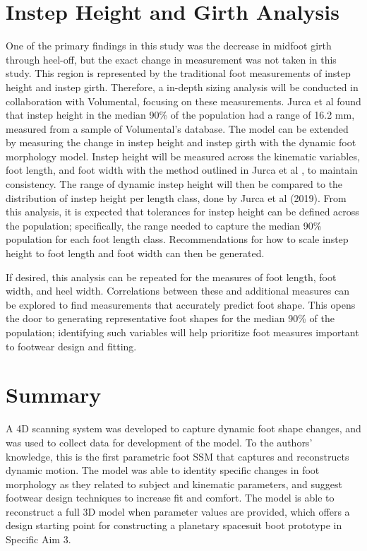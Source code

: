\documentclass[defaultstyle,11pt]{comps}
\begin{document}
\hypertarget{instep-height-and-girth-analysis}{%
\section{Instep Height and Girth Analysis}\label{instep-height-and-girth-analysis}}

One of the primary findings in this study was the decrease in midfoot girth through heel-off, but the exact change in measurement was not taken in this study.
This region is represented by the traditional foot measurements of instep height and instep girth.
Therefore, a in-depth sizing analysis will be conducted in collaboration with Volumental, focusing on these measurements.
Jurca et al \citep{Jurca2019} found that instep height in the median 90\% of the population had a range of 16.2 mm, measured from a sample of Volumental's database.
The model can be extended by measuring the change in instep height and instep girth with the dynamic foot morphology model.
Instep height will be measured across the kinematic variables, foot length, and foot width with the method outlined in Jurca et al \citep{Jurca2019}, to maintain consistency.
The range of dynamic instep height will then be compared to the distribution of instep height per length class, done by Jurca et al (2019).
From this analysis, it is expected that tolerances for instep height can be defined across the population; specifically, the range needed to capture the median 90\% population for each foot length class.
Recommendations for how to scale instep height to foot length and foot width can then be generated.

If desired, this analysis can be repeated for the measures of foot length, foot width, and heel width. Correlations between these and additional measures can be explored to find measurements that accurately predict foot shape. This opens the door to generating representative foot shapes for the median 90\% of the population; identifying such variables will help prioritize foot measures important to footwear design and fitting.

\hypertarget{summary-2}{%
\section{Summary}\label{summary-2}}

A 4D scanning system was developed to capture dynamic foot shape changes, and was used to collect data for development of the model.
To the authors' knowledge, this is the first parametric foot SSM that captures and reconstructs dynamic motion.
The model was able to identity specific changes in foot morphology as they related to subject and kinematic parameters, and suggest footwear design techniques to increase fit and comfort.
The model is able to reconstruct a full 3D model when parameter values are provided, which offers a design starting point for constructing a planetary spacesuit boot prototype in Specific Aim 3.
\end{document}
